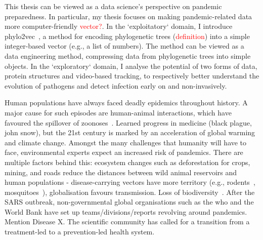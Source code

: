 This thesis can be viewed as a data science's perspective on pandemic preparedness. In particular, my thesis focuses on making pandemic-related data more computer-friendly \textcolor{red}{vector?}. In the `exploitatory` domain, I introduce phylo2vec~\cite{penn2025phylo2vec, scheidwasser2025}, a method for encoding phylogenetic trees (\textcolor{red}{definition}) into a simple integer-based vector (e.g., a list of numbers). The method can be viewed as a data engineering method, compressing data from phylogenetic trees into simple objects. In the `exploratory` domain, I analyse the potential of two forms of data, protein structures and video-based tracking, to respectively better understand the evolution of pathogens and detect infection early on and non-invasively.


Human populations have always faced deadly epidemics throughout history. A major cause for such episodes are human-animal interactions, which have favoured the spillover of zoonoses~\cite{sikora2025}. Learned progress in medicine (black plague, john snow), but the 21st century is marked by an acceleration of global warming and climate change. Amongst the many challenges that humanity will have to face, environmental experts expect an increased risk of pandemics. There are multiple factors behind this: ecosystem changes such as deforestation for crops, mining, and roads reduce the distances between wild animal reservoirs and human populations - disease-carrying vectors have more territory (e.g., rodents~\cite{johnson2020}, mosquitoes~\cite{jones2008, ryan2019}), globalisation favours transmission. Loss of biodiversity~\cite{keesing2010}. After the SARS outbreak, non-governmental global organisations such as the \gls{who} and the World Bank have set up teams/divisions/reports revolving around pandemics. Mention Disease X. The scientific community has called for a transition from a treatment-led to a prevention-led health system. 

